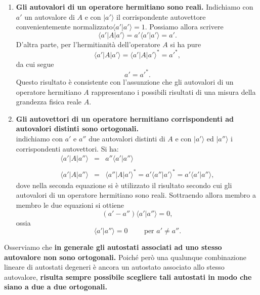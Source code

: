 \begin{enumerate}
\item \textbf{Gli autovalori di un operatore hermitiano sono reali.} Indichiamo con $a'$ un autovalore di $A$ e con $\vert a' \rangle $ il corrispondente autovettore convenientemente normalizzato$\langle a' \vert a' \rangle =1 $. Possiamo allora scrivere
\begin{equation}
\langle a' \vert A \vert a' \rangle = a' \langle a' \vert a' \rangle = a'.
\end{equation}
D'altra parte, per l'hermitianità dell'operatore $A$ si ha pure
\begin{equation}
\langle a' \vert A \vert a' \rangle = \langle a' \vert A \vert a' \rangle  ^* = a'^*,
\end{equation}
da cui segue
\begin{equation}
a'=a'^* .
\end{equation}
Questo risultato è consistente con l'assunzione che gli autovalori di un operatore hermitiano $A$ rappresentano i possibili risultati di una misura della grandezza fisica reale $A$.
\item \textbf{Gli autovettori di un operatore hermitiano corrispondenti ad autovalori distinti sono ortogonali.}\\
indichiamo con $a' $ e $a''$ due autovalori distinti di $A$ e con $\vert a' \rangle$ ed $\vert a'' \rangle$ i corrispondenti autovettori. Si ha:
\begin{eqnarray}
\langle a' \vert A \vert a'' \rangle & = & a'' \langle a' \vert a'' \rangle  \nonumber \\
\\
\langle a' \vert A \vert a'' \rangle & = & \langle a'' \vert A \vert a' \rangle ^* = a' \langle a'' \vert a' \rangle ^* = a' \langle a' \vert a'' \rangle , \nonumber 
\end{eqnarray}
dove nella seconda equazione si è utilizzato il risultato secondo cui gli autovalori di un operatore hermitiano sono reali. Sottraendo allora membro a membro le due equazioni si ottiene
\begin{equation}
(a'-a'') \langle a' \vert a'' \rangle =0,
\end{equation}
ossia
\begin{equation}
\langle a' \vert a'' \rangle =0 \qquad \textrm{ per } a' \neq a'' .
\end{equation}
\end{enumerate}
Osserviamo che \textbf{in generale gli autostati associati ad uno stesso autovalore non sono ortogonali.} Poiché però una qualunque combinazione lineare di autostati degeneri è ancora un autostato associato allo stesso autovalore, \textbf{risulta sempre possibile scegliere tali autostati in modo che siano a due a due ortogonali.}\\
